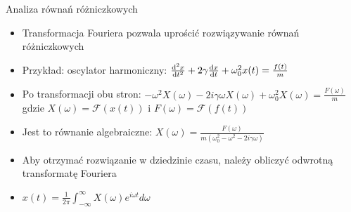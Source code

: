 \documentclass[polish, 12pt, aspectratio=169]{beamer}
\begin{document}
\begin{frame}{Analiza równań różniczkowych}
    \pause
    \begin{itemize}[<+->]
        \item Transformacja Fouriera pozwala uprościć rozwiązywanie równań różniczkowych
        \item Przykład: oscylator harmoniczny: \( \dv[2]{x}{t} + 2\gamma \dv{x}{t} + \omega_0^2 x(t) = \frac{f(t)}{m} \)
        \item Po transformacji obu stron: \( -\omega^2 X(\omega) - 2i\gamma\omega X(\omega) + \omega_0^2 X(\omega) = \frac{F(\omega)}{m} \) \\
              gdzie \( X(\omega) = \mathcal{F}(x(t)) \) i \( F(\omega) = \mathcal{F}(f(t)) \)
        \item Jest to równanie algebraiczne: \( X(\omega) = \frac{F(\omega)}{m(\omega_0^2 - \omega^2 - 2i\gamma\omega)} \)
        \item Aby otrzymać rozwiązanie w dziedzinie czasu, należy obliczyć odwrotną transformatę Fouriera
        \item \( x(t) = \frac{1}{2\pi} \int_{-\infty}^{\infty} X(\omega) e^{i\omega t} d\omega \)
    \end{itemize}
\end{frame}
\end{document}
